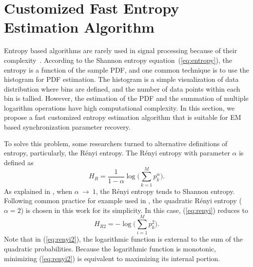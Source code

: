 \documentclass[journal,comsoc,onecolumn, 12pt,draftclsnofoot]{IEEEtran}
\begin{document}
\section{Customized Fast Entropy Estimation Algorithm}
\label{sec:cust_entp}
Entropy based algorithms are rarely used in signal processing because of their complexity~\cite{Bercher2000}.
According to the Shannon entropy equation~(\ref{eq:entropy}), the entropy is a function of the sample PDF, and one common technique is to use the histogram for PDF estimation.
The histogram is a simple visualization of data distribution where bins are defined, and the number of data points within each bin is tallied. 
However, the estimation of the PDF and the summation of multiple logarithm operations have high computational complexity.
In this section, we propose a fast customized entropy estimation algorithm that is suitable for EM based synchronization parameter recovery. 

To solve this problem, some researchers turned to alternative definitions of entropy, particularly, the R\'enyi entropy.
The R\'enyi entropy  with parameter \(\alpha\) is defined as \cite{renyi1961measures}
\begin{equation}
H_{R }={\frac {1}{1-\alpha }}\log {\Bigg (}\sum _{k=1}^{M}p_{k}^{\alpha }{\Bigg )}.
\label{eq:renyi}
\end{equation}
As explained in \cite{Bromiley2004}, when $\alpha~\to~1$, the R\'enyi entropy tends to Shannon entropy.
Following common practice for example used in \cite{Santamaria2002}, the quadratic R\'enyi entropy ($\alpha=2$) is chosen in this work for its simplicity.
In this case, (\ref{eq:renyi}) reduces to
\begin{equation}
H_{R2 }=-\log {\Bigg (}\sum _{i=1}^{M}p_{k}^{2 }{\Bigg )}.
\label{eq:renyi2}
\end{equation}
Note that in (\ref{eq:renyi2}), the logarithmic function is  external to the sum of the quadratic probabilities.
Because the logarithmic function is monotonic, minimizing (\ref{eq:renyi2}) is equivalent to maximizing its internal portion.
\end{document}
